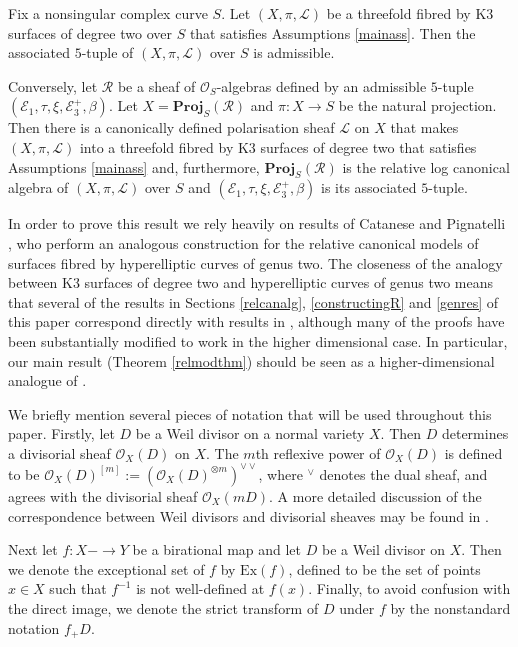 \documentclass{amsart}
\begin{document}
\begin{thm} Fix a nonsingular complex curve $S$. Let $(X,\pi,{\mathcal{L}})$ be a threefold fibred by K3 surfaces of degree two over $S$ that satisfies Assumptions \ref{mainass}. Then the associated $5$-tuple of $(X,\pi,{\mathcal{L}})$ over $S$ is admissible.

Conversely, let ${\mathcal{R}}$ be a sheaf of ${\mathcal{O}}_S$-algebras defined by an admissible $5$-tuple $({\mathcal{E}}_1,\tau,\xi,{\mathcal{E}}_3^+,\beta)$. Let $X = \mathbf{Proj}_S({\mathcal{R}})$ and $\pi\colon X \to S$ be the natural projection. Then there is a canonically defined polarisation sheaf ${\mathcal{L}}$ on $X$ that makes $(X,\pi,{\mathcal{L}})$ into a threefold fibred by K3 surfaces of degree two that satisfies Assumptions \ref{mainass} and, furthermore, $\mathbf{Proj}_S({\mathcal{R}})$ is the relative log canonical algebra of $(X,\pi,{\mathcal{L}})$ over $S$ and $({\mathcal{E}}_1,\tau,\xi,{\mathcal{E}}_3^+,\beta)$ is its associated $5$-tuple.\end{thm}

In order to prove this result we rely heavily on results of Catanese and Pignatelli \cite{flgi}, who perform an analogous construction for the relative canonical models of surfaces fibred by hyperelliptic curves of genus two. The closeness of the analogy between K3 surfaces of degree two and hyperelliptic curves of genus two means that several of the results in Sections \ref{relcanalg}, \ref{constructingR} and \ref{genres} of this paper correspond directly with results in \cite{flgi}, although many of the proofs have been substantially modified to work in the higher dimensional case. In particular, our main result (Theorem \ref{relmodthm}) should be seen as a higher-dimensional analogue of \cite[Theorem 4.13]{flgi}.

\proof[Notation] We briefly mention several pieces of notation that will be used throughout this paper. Firstly, let
$D$ be a Weil divisor on a normal variety $X$. Then $D$ determines a divisorial sheaf ${\mathcal{O}}_X(D)$ on $X$. The $m$th reflexive power of ${\mathcal{O}}_X(D)$ is defined to be ${\mathcal{O}}_X(D)^{[m]} := ({\mathcal{O}}_X(D)^{\otimes m})^{\vee\vee}$, where $\mbox{}^\vee$ denotes the dual sheaf, and agrees with the divisorial sheaf ${\mathcal{O}}_X(mD)$. A more detailed discussion of the correspondence between Weil divisors and divisorial sheaves may be found in \cite[Appendix 1]{c3f}. 

Next let $f\colon X - \to Y$ be a birational map and let $D$ be a Weil divisor on $X$. Then we denote the exceptional set of $f$ by $\mathrm{Ex}(f)$, defined to be the set of points $x \in X$ such that $f^{-1}$ is not well-defined at $f(x)$. Finally, to avoid confusion with the direct image, we denote the strict transform of $D$ under $f$ by the nonstandard notation $f_+D$.
\end{document}
